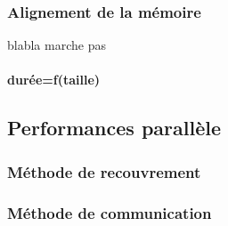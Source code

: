\subsubsection{Alignement de la mémoire}
blabla marche pas

\paragraph{durée=f(taille)}


\subsection{Performances parallèle}

\subsubsection{Méthode de recouvrement}



\subsubsection{Méthode de communication}
